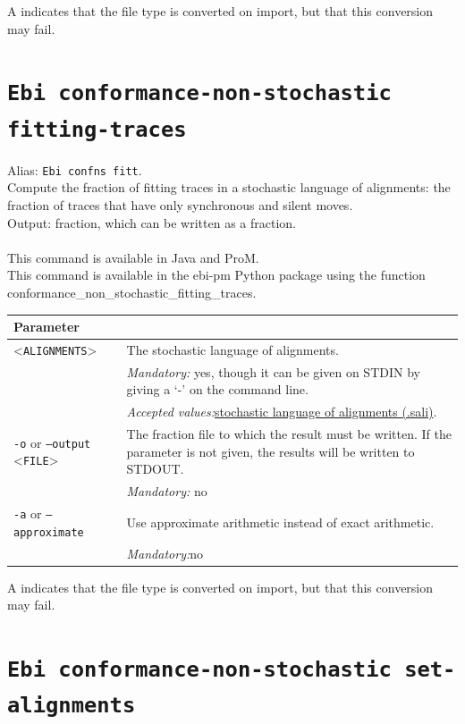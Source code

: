 {\begin{tabularx}{\linewidth}{lX}
\bottomrule
\end{tabularx}
A \textdagger{} indicates that the file type is converted on import, but that this conversion may fail.
\clearpage\section{\texttt{Ebi conformance-non-stochastic fitting-traces}}
\label{command:Ebi conformance-non-stochastic fitting-traces}
Alias: \texttt{Ebi confns fitt}.\\
Compute the fraction of fitting traces in a stochastic language of alignments: the fraction of traces that have only synchronous and silent moves.\\
\noindent Output: fraction, which can be written as a fraction.\\
\\This command is available in Java and ProM.
\\This command is available in the ebi-pm Python package using the function conformance\_non\_stochastic\_fitting\_traces.
\begin{tabularx}{\linewidth}{lX}
\toprule
Parameter \\\midrule
<\texttt{ALIGNMENTS}>&The stochastic language of alignments.\\
&\textit{Mandatory:} \quad yes, though it can be given on STDIN by giving a `-' on the command line.\\
&\textit{Accepted values:}\quad \hyperref[filehandler:stochastic language of alignments]{stochastic language of alignments (.sali)}.\\
\texttt{-o} or \texttt{--output} <\texttt{FILE}> &
The fraction file to which the result must be written. If the parameter is not given, the results will be written to STDOUT.\\
&\textit{Mandatory:} \quad no\\
\texttt{-a} or \texttt{--approximate} & Use approximate arithmetic instead of exact arithmetic.\\
&\textit{Mandatory:}\quad no\\
\bottomrule
\end{tabularx}
A \textdagger{} indicates that the file type is converted on import, but that this conversion may fail.
\clearpage\section{\texttt{Ebi conformance-non-stochastic set-alignments}}
\label{command:Ebi conformance-non-stochastic set-alignments}
}

